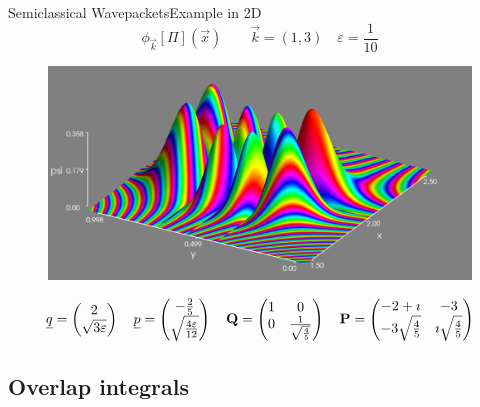 \documentclass{beamer}
\begin{document}
\begin{frame}{Semiclassical Wavepackets}{Example in 2D}
  \vspace{-0.4cm}
  \scriptsize
  \begin{equation*}
    \phi_{\vec{k}}[\Pi](\vec{x}) \quad\quad \vec{k} = (1,3) \quad \varepsilon = \frac{1}{10}
  \end{equation*}
  \vspace{-0.4cm}
  \begin{figure}[h!]
    \centering
    \includegraphics[width=0.8\linewidth]{./fig/wavepackets_2d.png}
  \end{figure}
    \scriptsize
  \begin{equation*}
    \underline{q} =
    \begin{pmatrix}
      2 \\ \sqrt{3\varepsilon}
    \end{pmatrix}
    \quad
    \underline{p} =
    \begin{pmatrix}
      -\frac{2}{5} \\ \sqrt{\frac{4\varepsilon}{12}}
    \end{pmatrix}
    \quad
    \mathbf{Q} =
    \begin{pmatrix}
      1 & 0 \\
      0 & \frac{1}{\sqrt{\frac{4}{5}}}
    \end{pmatrix}
    \quad
    \mathbf{P} =
    \begin{pmatrix}
      -2+\imath & -3 \\
      -3\sqrt{\frac{4}{5}} & \imath\sqrt{\frac{4}{5}}
    \end{pmatrix}
  \end{equation*}
\end{frame}


\subsection{Overlap integrals}
\end{document}
